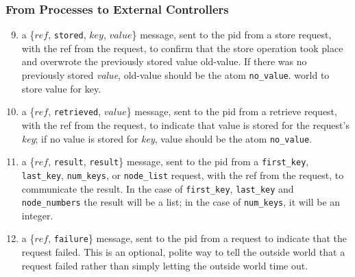 \documentclass[11pt]{article}
\begin{document}
\subsubsection{From Processes to External Controllers}
\begin{enumerate}[M1]
\setcounter{enumi}{8}
\newcommand{\stored}{\texttt{stored}}
\newcommand{\retrieved}{\texttt{retrieved}}
\newcommand{\result}{\texttt{result}}
\newcommand{\failure}{\texttt{failure}}

\item a \{$ref$, \stored, $key$, $value$\} message, sent to the pid from a store request, with the ref from the request, to confirm that the store operation took place and overwrote the previously stored value old-value. If there was no previously stored \textit{value}, old-value should be the atom \texttt{no\_value}. world to store value for key.
\item a \{$ref$, \retrieved, $value$\} message, sent to the pid from a retrieve request, with the ref from the request, to indicate that value is stored for the request’s \textit{key}; if no value is stored for \textit{key}, value should be the atom \texttt{no\_value}.
\item a \{$ref$, \texttt{result}, \result\} message,
sent to the pid from a \texttt{first\_key}, \texttt{last\_key}, \texttt{num\_keys}, or \texttt{node\_list} request, with the ref from the request, to communicate the result. In the case of \texttt{first\_key}, \texttt{last\_key} and \texttt{node\_numbers} the result will be a list; in the case of \texttt{num\_keys}, it will be an integer.
\item a \{$ref$, \failure\} message, sent to the pid from a request to indicate that the request failed. This is an optional, polite way to tell the outside world that a request failed rather than simply letting the outside world time out.
\end{enumerate}
\end{document}
